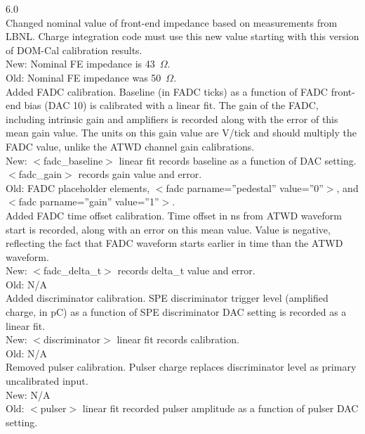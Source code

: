 \documentclass[10pt]{article}
\begin{document}
\item{6.0}\\ 
  Changed nominal value of front-end impedance based on measurements from
  LBNL.  Charge integration code must use this new value starting with this
  version of DOM-Cal calibration results.\\
  New: Nominal FE impedance is 43\ $\Omega$.\\
  Old: Nominal FE impedance was 50\ $\Omega$.\\

  Added FADC calibration.  Baseline (in FADC ticks) as a function of FADC
  front-end bias (DAC 10) is calibrated with a linear fit.  The gain of the
  FADC, including intrinsic gain and amplifiers is recorded along with
  the error of this mean gain value.  The units on this gain value are
  V/tick and should multiply the FADC value, unlike the ATWD channel gain
  calibrations.\\
  New: $<$fadc\_baseline$>$ linear fit records baseline as a function of
  DAC setting.  $<$fadc\_gain$>$ records gain value and error.\\
  Old: FADC placeholder elements, $<$fadc parname=''pedestal''
  value=''0''$>$, and $<$fadc parname=''gain'' value=''1''$>$.\\

  Added FADC time offset calibration.  Time offset in ns from ATWD waveform
  start is recorded, along with an error on this mean value.  Value is
  negative, reflecting the fact that FADC waveform starts earlier in time
  than the ATWD waveform.\\
  New: $<$fadc\_delta\_t$>$ records delta\_t value and error.\\
  Old: N/A\\

  Added discriminator calibration.  SPE discriminator trigger level
  (amplified charge, in pC) as a function of SPE discriminator DAC setting
  is recorded as a linear fit.\\
  New: $<$discriminator$>$ linear fit records calibration.\\
  Old: N/A\\

  Removed pulser calibration.  Pulser charge replaces discriminator level
  as primary uncalibrated input.\\
  New: N/A\\
  Old: $<$pulser$>$ linear fit recorded pulser amplitude as a function of
  pulser DAC setting.
\end{document}
